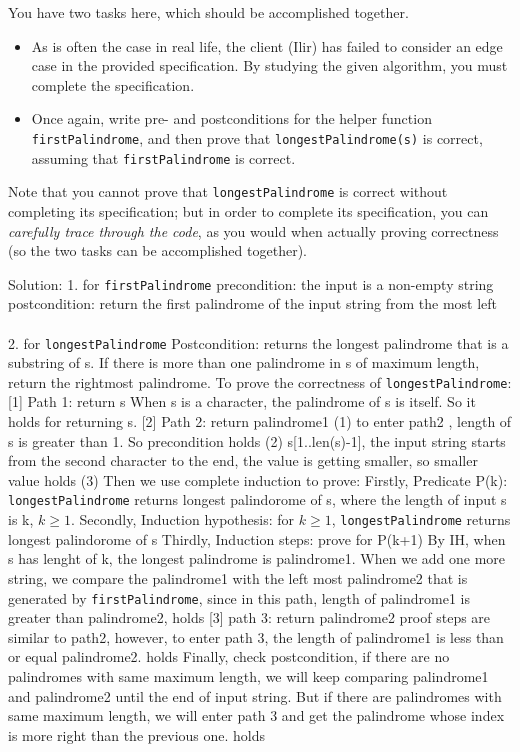 \documentclass[12pt]{article}
\begin{document}
  You have two tasks here, which should be accomplished together.
  \begin{itemize}
    \item As is often the case in real life, the client (Ilir) has failed to consider an edge case in the provided specification. By studying the given algorithm, you must complete the specification.
    \item Once again, write pre- and postconditions for the helper function \texttt{firstPalindrome}, and then prove that \texttt{longestPalindrome(s)} is correct, assuming that \texttt{firstPalindrome} is correct.
  \end{itemize}
  
  Note that you cannot prove that \texttt{longestPalindrome} is correct without completing its specification; but in order to complete its specification, you can \emph{carefully trace through the code}, as you would when actually proving correctness (so the two tasks can be accomplished together).
  
  
Solution:\vskip5pt
1. for \texttt{firstPalindrome}\vskip5pt
precondition: the input is a non-empty string\vskip5pt
postcondition: return the first palindrome of the input string from the most left \\[2ex]
\\[2ex]
2. for \texttt{longestPalindrome}\vskip5pt
Postcondition: returns the longest palindrome that is a substring of s. If there is more than one palindrome in s of maximum length, return the rightmost palindrome.\vskip5pt
To prove the correctness of \texttt{longestPalindrome}:\vskip5pt
[1] Path 1: return s\vskip5pt 
When s is a character, the palindrome of s is itself. So it holds for returning s.\vskip5pt
[2] Path 2: return palindrome1 \vskip5pt
\qquad(1) to enter path2 , length of s is greater than 1. So precondition holds\vskip5pt
\qquad(2) s[1..len(s)-1], the input string starts from the second character to the end, the value is getting smaller, so smaller value holds\vskip5pt
\qquad(3) Then we use complete induction to prove:\vskip5pt
\qquad Firstly,  Predicate P(k): \texttt{longestPalindrome} returns longest palindorome of s, where the length of input s is k, $k \ge 1$.\vskip5pt
\qquad Secondly, Induction hypothesis: for $k \ge 1$, \texttt{longestPalindrome} returns longest palindorome of s\vskip5pt
\qquad Thirdly, Induction steps: prove for P(k+1)\vskip5pt
By IH, when s has lenght of k, the longest palindrome is palindrome1. When we add one more string, we compare the palindrome1 with the left most palindrome2 that is generated by \texttt{firstPalindrome}, since in this path, length of palindrome1 is greater than palindrome2, holds\vskip5pt
[3] path 3: return palindrome2\vskip5pt
proof steps are similar to path2, however, to enter path 3, the length of palindrome1 is less than or equal palindrome2. holds\vskip5pt
Finally, check postcondition, if there are no palindromes with same maximum length, we will keep comparing palindrome1 and palindrome2 until the end of input string. But if there are palindromes with same maximum length, we will enter path 3 and get the palindrome whose index is more right than the previous one. holds  
\end{document}
